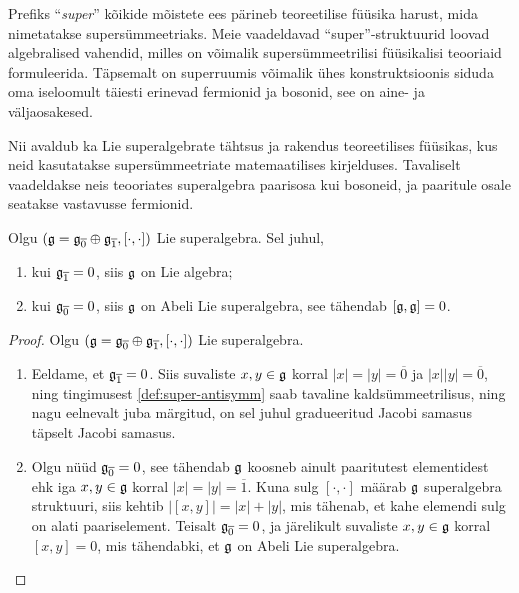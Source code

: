 \begin{markus}
    Prefiks "`\emph{super}"' kõikide mõistete ees pärineb teoreetilise füüsika
    harust, mida nimetatakse supersümmeetriaks. Meie vaadeldavad
    "`super"'-struktuurid loovad algebralised vahendid, milles on
    võimalik supersümmeetrilisi füüsikalisi teooriaid formuleerida.
    Täpsemalt on superruumis võimalik ühes konstruktsioonis siduda oma
    iseloomult täiesti erinevad fermionid ja bosonid, see on aine- ja
    väljaosakesed.

    Nii avaldub ka Lie superalgebrate tähtsus ja rakendus teoreetilises
    füüsikas, kus neid kasutatakse supersümmeetriate matemaatilises
    kirjelduses. Tavaliselt vaadeldakse neis teooriates superalgebra
    paarisosa kui bosoneid, ja paaritule osale seatakse vastavusse fermionid.
\end{markus}

\begin{lau}
    Olgu $(\mathfrak{g} = \mathfrak{g}_{\overline{0}} \oplus \mathfrak{g}_{\overline{1}}, [\cdot, \cdot])$
    Lie superalgebra. Sel juhul,
    \begin{enumerate}[label=\arabic*)]
        \item kui $\mathfrak{g}_{\overline{1}} = 0$, siis $\mathfrak{g}$ on Lie algebra;
        \item kui $\mathfrak{g}_{\overline{0}} = 0$, siis $\mathfrak{g}$ on Abeli Lie
            superalgebra, see tähendab $[\mathfrak{g}, \mathfrak{g}] = 0$.
    \end{enumerate}
\end{lau}

\begin{proof}
    Olgu $(\mathfrak{g} = \mathfrak{g}_{\overline{0}} \oplus \mathfrak{g}_{\overline{1}}, [\cdot, \cdot])$
    Lie superalgebra.
    \begin{enumerate}[label=\arabic*)]
        \item Eeldame, et $\mathfrak{g}_{\overline{1}} = 0$. Siis suvaliste
            $x, y \in \mathfrak{g}$ korral $|x| = |y| = \overline{0}$ ja
            $|x||y| = \overline{0}$, ning tingimusest
            \eqref{def:super-antisymm} saab tavaline kaldsümmeetrilisus,
            ning nagu eelnevalt juba märgitud, on sel juhul gradueeritud
            Jacobi samasus täpselt Jacobi samasus.
        \item Olgu nüüd $\mathfrak{g}_{\overline{0}} = 0$, see tähendab $\mathfrak{g}$ koosneb
            ainult paaritutest elementidest ehk iga $x, y \in \mathfrak{g}$ korral
            $|x| = |y| = \overline{1}$. Kuna sulg $[\cdot, \cdot]$
            määrab $\mathfrak{g}$ superalgebra struktuuri, siis kehtib
            $\left| [x, y] \right| = |x| + |y|$, mis tähenab, et
            kahe elemendi sulg on alati paariselement. Teisalt
            $\mathfrak{g}_{\overline{0}} = 0$, ja järelikult suvaliste $x, y \in \mathfrak{g}$
            korral $[x, y] = 0$, mis tähendabki, et $\mathfrak{g}$ on Abeli
            Lie superalgebra.
    \end{enumerate}
\end{proof}

